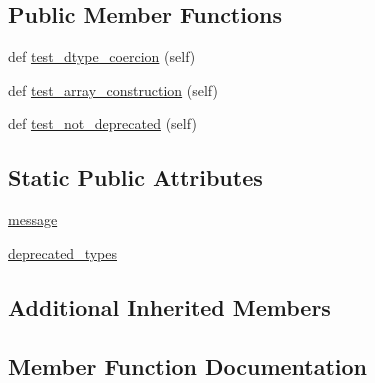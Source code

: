 \subsection*{Public Member Functions}
\begin{DoxyCompactItemize}
\item 
def \hyperlink{classnumpy_1_1core_1_1tests_1_1test__deprecations_1_1TestDTypeCoercion_af8da57808e4e586c664e28015a8a5e8e}{test\+\_\+dtype\+\_\+coercion} (self)
\item 
def \hyperlink{classnumpy_1_1core_1_1tests_1_1test__deprecations_1_1TestDTypeCoercion_ac66dcb7b7b248cd1fe7acc9f75ac5f83}{test\+\_\+array\+\_\+construction} (self)
\item 
def \hyperlink{classnumpy_1_1core_1_1tests_1_1test__deprecations_1_1TestDTypeCoercion_ab9aad98ba7e5cec129b6eaa36be4dc3e}{test\+\_\+not\+\_\+deprecated} (self)
\end{DoxyCompactItemize}
\subsection*{Static Public Attributes}
\begin{DoxyCompactItemize}
\item 
\hyperlink{classnumpy_1_1core_1_1tests_1_1test__deprecations_1_1TestDTypeCoercion_a014b3ddd5044c3c2a3f6121b9ad5f576}{message}
\item 
\hyperlink{classnumpy_1_1core_1_1tests_1_1test__deprecations_1_1TestDTypeCoercion_aecd029b7835415620992e9d50e835193}{deprecated\+\_\+types}
\end{DoxyCompactItemize}
\subsection*{Additional Inherited Members}


\subsection{Member Function Documentation}
\mbox{\label{classnumpy_1_1core_1_1tests_1_1test__deprecations_1_1TestDTypeCoercion_ac66dcb7b7b248cd1fe7acc9f75ac5f83}} 
